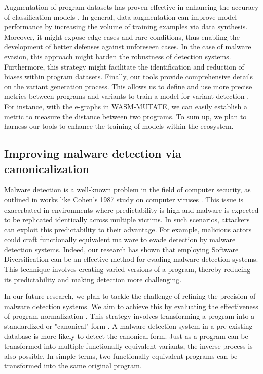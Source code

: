 Augmentation of program datasets has proven effective in enhancing the accuracy of classification models \cite{2021arXiv210311882S, selfAPR, 10.1109/TSE.2023.3240118}.
In general, data augmentation can improve model performance by increasing the volume of training examples via data synthesis.
Moreover, it might expose edge cases and rare conditions, thus enabling the development of better defenses against unforeseen cases.
In the case of malware evasion, this approach might harden the robustness of detection systems.
Furthermore, this strategy might facilitate the identification and reduction of biases within \Wasm program datasets. 
Finally, our tools provide comprehensive details on the variant generation process. 
This allows us to define and use more precise metrics between programs and variants to train a model for variant detection \cite{li2023rethinking}. 
For instance, with the e-graphs in WASM-MUTATE, we can easily establish a metric to measure the distance between two programs. 
To sum up, we plan to harness our tools to enhance the training of models within the \Wasm ecosystem. 


\vspace{-0.3cm}
\subsection{Improving \Wasm malware detection via canonicalization}

Malware detection is a well-known problem in the field of computer security, as outlined in works like Cohen's 1987 study on computer viruses \cite{cohen1987computer}. 
This issue is exacerbated in environments where predictability is high and malware is expected to be replicated identically across multiple victims. 
In such scenarios, attackers can exploit this predictability to their advantage. 
For example, malicious actors could craft functionally equivalent malware to evade detection by malware detection systems.
Indeed, our research has shown that employing Software Diversification can be an effective method for evading malware detection systems. 
This technique involves creating varied versions of a program, thereby reducing its predictability and making detection more challenging. 


In our future research, we plan to tackle the challenge of refining the precision of malware detection systems. 
We aim to achieve this by evaluating the effectiveness of program normalization \cite{seideman2023transformation}. 
This strategy involves transforming a program into a standardized or "canonical" form \cite{Huang2017BinSequenceFA}.
A malware detection system in a pre-existing database is more likely to detect the canonical form.
Just as a program can be transformed into multiple functionally equivalent variants, the inverse process is also possible. 
In simple terms, two functionally equivalent programs can be transformed into the same original program. 



